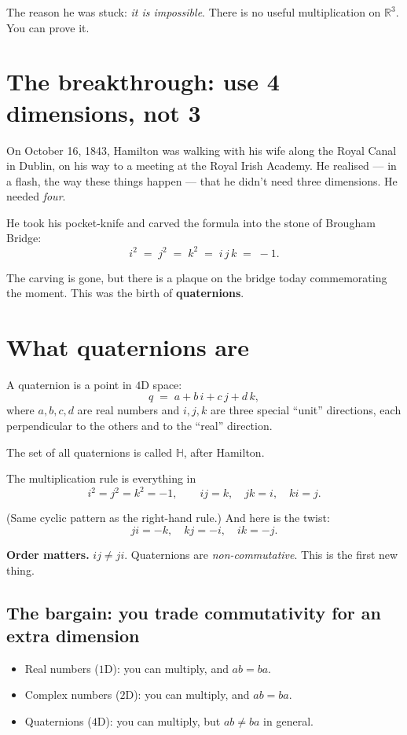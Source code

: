 \documentclass[11pt]{article}
\newcommand{\R}{\mathbb{R}}
\newcommand{\HH}{\mathbb{H}}
\begin{document}
The reason he was stuck: \emph{it is impossible}. There is no useful
multiplication on $\R^3$. You can prove it.

\section*{The breakthrough: use 4 dimensions, not 3}

On October 16, 1843, Hamilton was walking with his wife along the
Royal Canal in Dublin, on his way to a meeting at the Royal Irish
Academy. He realised --- in a flash, the way these things happen
--- that he didn't need three dimensions. He needed \emph{four}.

He took his pocket-knife and carved the formula into the stone of
Brougham Bridge:
\[
i^2 \;=\; j^2 \;=\; k^2 \;=\; i\,j\,k \;=\; -1 .
\]

The carving is gone, but there is a plaque on the bridge today
commemorating the moment. This was the birth of \textbf{quaternions}.

\section*{What quaternions are}

A quaternion is a point in $4$D space:
\[
q \;=\; a + b\,i + c\,j + d\,k ,
\]
where $a, b, c, d$ are real numbers and $i, j, k$ are three special
``unit'' directions, each perpendicular to the others and to the
``real'' direction.

The set of all quaternions is called $\HH$, after Hamilton.

The multiplication rule is everything in
\[
i^2 = j^2 = k^2 = -1, \qquad
ij = k, \quad jk = i, \quad ki = j .
\]

(Same cyclic pattern as the right-hand rule.) And here is the
twist:
\[
ji = -k, \quad kj = -i, \quad ik = -j .
\]

\textbf{Order matters.} $ij \neq ji$. Quaternions are
\emph{non-commutative}. This is the first new thing.

\subsection*{The bargain: you trade commutativity for an extra dimension}

\begin{itemize}[leftmargin=*, itemsep=2pt]
  \item Real numbers ($1$D): you can multiply, and $ab = ba$.
  \item Complex numbers ($2$D): you can multiply, and $ab = ba$.
  \item Quaternions ($4$D): you can multiply, but $ab \neq ba$
        in general.
\end{itemize}
\end{document}

